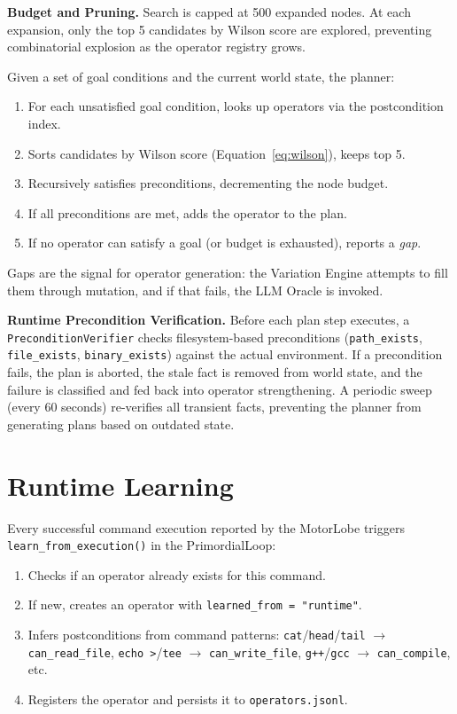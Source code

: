 \documentclass[12pt,a4paper]{report}
\begin{document}
\textbf{Budget and Pruning.} Search is capped at 500 expanded nodes. At each expansion, only the top 5 candidates by Wilson score are explored, preventing combinatorial explosion as the operator registry grows.

Given a set of goal conditions and the current world state, the planner:
\begin{enumerate}
    \item For each unsatisfied goal condition, looks up operators via the postcondition index.
    \item Sorts candidates by Wilson score (Equation~\ref{eq:wilson}), keeps top 5.
    \item Recursively satisfies preconditions, decrementing the node budget.
    \item If all preconditions are met, adds the operator to the plan.
    \item If no operator can satisfy a goal (or budget is exhausted), reports a \emph{gap}.
\end{enumerate}

Gaps are the signal for operator generation: the Variation Engine attempts to fill them through mutation, and if that fails, the LLM Oracle is invoked.

\textbf{Runtime Precondition Verification.} Before each plan step executes, a \texttt{PreconditionVerifier} checks filesystem-based preconditions (\texttt{path\_exists}, \texttt{file\_exists}, \texttt{binary\_exists}) against the actual environment. If a precondition fails, the plan is aborted, the stale fact is removed from world state, and the failure is classified and fed back into operator strengthening. A periodic sweep (every 60 seconds) re-verifies all transient facts, preventing the planner from generating plans based on outdated state.

\section{Runtime Learning}
Every successful command execution reported by the MotorLobe triggers \texttt{learn\_from\_execution()} in the PrimordialLoop:

\begin{enumerate}
    \item Checks if an operator already exists for this command.
    \item If new, creates an operator with \texttt{learned\_from = "runtime"}.
    \item Infers postconditions from command patterns: \texttt{cat}/\texttt{head}/\texttt{tail} $\to$ \texttt{can\_read\_file}, \texttt{echo >}/\texttt{tee} $\to$ \texttt{can\_write\_file}, \texttt{g++}/\texttt{gcc} $\to$ \texttt{can\_compile}, etc.
    \item Registers the operator and persists it to \texttt{operators.jsonl}.
\end{enumerate}
\end{document}
